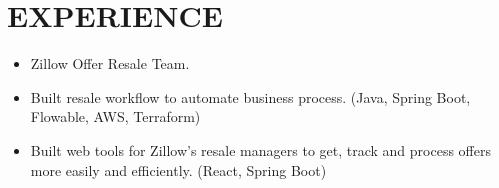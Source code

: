 
\section{EXPERIENCE}

{
{
    \begin{itemize}
        \item Zillow Offer Resale Team.
        \item Built resale workflow to automate business process. (Java, Spring Boot, Flowable, AWS, Terraform) 
        \item Built web tools for Zillow's resale managers to get, track and process offers more easily and efficiently. (React, Spring Boot)
    \end{itemize}
}   
}